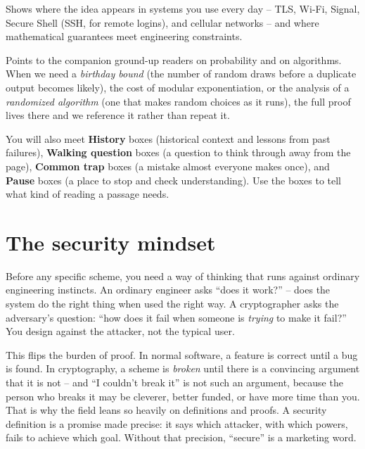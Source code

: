 \begin{applicationbox}
Shows where the idea appears in systems you use every day -- TLS, Wi-Fi, Signal, Secure Shell (SSH, for remote logins), and cellular networks -- and where mathematical guarantees meet engineering constraints.
\end{applicationbox}

\begin{connectionbox}
Points to the companion ground-up readers on probability and on algorithms. When we need a \emph{birthday bound} (the number of random draws before a duplicate output becomes likely), the cost of modular exponentiation, or the analysis of a \emph{randomized algorithm} (one that makes random choices as it runs), the full proof lives there and we reference it rather than repeat it.
\end{connectionbox}

You will also meet \textbf{History} boxes (historical context and lessons from past failures), \textbf{Walking question} boxes (a question to think through away from the page), \textbf{Common trap} boxes (a mistake almost everyone makes once), and \textbf{Pause} boxes (a place to stop and check understanding). Use the boxes to tell what kind of reading a passage needs.

\section*{The security mindset}

Before any specific scheme, you need a way of thinking that runs against ordinary engineering instincts. An ordinary engineer asks ``does it work?'' -- does the system do the right thing when used the right way. A cryptographer asks the adversary's question: ``how does it fail when someone is \emph{trying} to make it fail?'' You design against the attacker, not the typical user.

This flips the burden of proof. In normal software, a feature is correct until a bug is found. In cryptography, a scheme is \emph{broken} until there is a convincing argument that it is not -- and ``I couldn't break it'' is not such an argument, because the person who breaks it may be cleverer, better funded, or have more time than you. That is why the field leans so heavily on definitions and proofs. A security definition is a promise made precise: it says which attacker, with which powers, fails to achieve which goal. Without that precision, ``secure'' is a marketing word.

